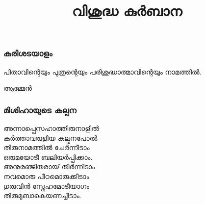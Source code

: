 \documentclass[20pt]{beamer}
\title{വിശുദ്ധ കുര്‍ബാന}
\newcommand{\Priest}[1]{\color{white}#1}
\newcommand{\People}[1]{\color{yellow}#1}
\newcommand{\Ammen}{\People{ആമ്മേന്‍}}
\begin{document}
\begin{frame}[allowframebreaks]
\frametitle{കുരിശടയാളം}
\Priest{
പിതാവിന്റെയും പുത്രന്റെയും പരിശുദ്ധാത്മാവിന്റെയും നാമത്തില്‍.
}
\Ammen
\end{frame}

\begin{frame}[allowframebreaks]
\frametitle{മിശിഹായുടെ കല്പന}
\Priest{
അന്നാപ്പെസഹാത്തിരുനാളില്‍\\
കര്‍ത്താവരുളിയ കല്പനപോല്‍\\
തിരുനാമത്തില്‍ ചേര്‍ന്നീടാം\\
ഒരുമയോടീ ബലിയര്‍പ്പിക്കാം.\\
}
\People{
അനുരഞ്ജിതരായ് തീര്‍ന്നീടാം\\
നവമൊരു പീഠമൊരുക്കീടാം\\
ഗുരുവിന്‍ സ്നേഹമോടീയാഗം\\
തിരുമുബാകെയണച്ചീടാം.
}

\end{frame}
\end{document}
